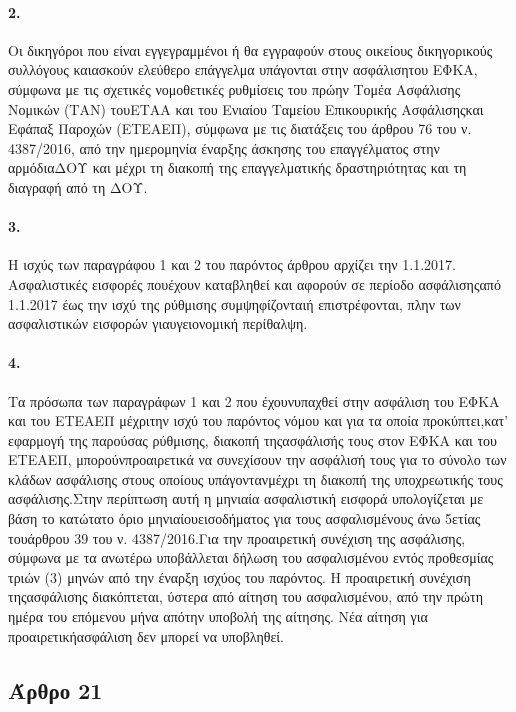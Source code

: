 \documentclass[a4paper,oneside, 10pt]{book}
\begin{document}
\paragraph { 2. } Οι δικηγόροι που είναι εγγεγραμμένοι ή θα εγγραφούν στους οικείους δικηγορικούς συλλόγους καιασκούν ελεύθερο επάγγελμα υπάγονται στην ασφάλισητου ΕΦΚΑ, σύμφωνα με τις σχετικές νομοθετικές ρυθμίσεις του πρώην Τομέα Ασφάλισης Νομικών (ΤΑΝ) τουΕΤΑΑ και του Ενιαίου Ταμείου Επικουρικής Ασφάλισηςκαι Εφάπαξ Παροχών (ΕΤΕΑΕΠ), σύμφωνα με τις διατάξεις του άρθρου 76 του ν. 4387/2016, από την ημερομηνία έναρξης άσκησης του επαγγέλματος στην αρμόδιαΔΟΥ και μέχρι τη διακοπή της επαγγελματικής δραστηριότητας και τη διαγραφή από τη ΔΟΥ.
\paragraph { 3. } Η ισχύς των παραγράφου 1 και 2 του παρόντος άρθρου αρχίζει την 1.1.2017. Ασφαλιστικές εισφορές πουέχουν καταβληθεί και αφορούν σε περίοδο ασφάλισηςαπό 1.1.2017 έως την ισχύ της ρύθμισης συμψηφίζονταιή επιστρέφονται, πλην των ασφαλιστικών εισφορών γιαυγειονομική περίθαλψη.
\paragraph { 4. } Τα πρόσωπα των παραγράφων 1 και 2 που έχουνυπαχθεί στην ασφάλιση του ΕΦΚΑ και του ΕΤΕΑΕΠ μέχριτην ισχύ του παρόντος νόμου και για τα οποία προκύπτει,κατ’ εφαρμογή της παρούσας ρύθμισης, διακοπή τηςασφάλισής τους στον ΕΦΚΑ και του ΕΤΕΑΕΠ, μπορούνπροαιρετικά να συνεχίσουν την ασφάλισή τους για το σύνολο των κλάδων ασφάλισης στους οποίους υπάγοντανμέχρι τη διακοπή της υποχρεωτικής τους ασφάλισης.Στην περίπτωση αυτή η μηνιαία ασφαλιστική εισφορά υπολογίζεται με βάση το κατώτατο όριο μηνιαίουεισοδήματος για τους ασφαλισμένους άνω 5ετίας τουάρθρου 39 του ν. 4387/2016.Για την προαιρετική συνέχιση της ασφάλισης, σύμφωνα με τα ανωτέρω υποβάλλεται δήλωση του ασφαλισμένου εντός προθεσμίας τριών (3) μηνών από την έναρξη ισχύος του παρόντος. Η προαιρετική συνέχιση τηςασφάλισης διακόπτεται, ύστερα από αίτηση του ασφαλισμένου, από την πρώτη ημέρα του επόμενου μήνα απότην υποβολή της αίτησης. Νέα αίτηση για προαιρετικήασφάλιση δεν μπορεί να υποβληθεί.
\subsection*{ Άρθρο 21 }
\end{document}
